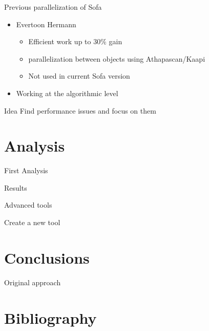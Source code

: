 \documentclass[xcolor={usenames,dvipsnames},draft]{beamer}
\newcommand{\sectiontitle}{}
\newcommand{\newsection}[1]{\renewcommand{\sectiontitle}{#1}\section{#1}}
\newcommand{\newHsection}[1]{\renewcommand{\sectiontitle}{#1}\section*{#1}}
\begin{document}
\begin{frame}{Previous parallelization of Sofa}
    \begin{itemize}
        \item Evertoon Hermann\cite{Hermann10Simulations} \\
            \begin{itemize}
                \item Efficient work up to $30\%$ gain 
                \item parallelization between objects using Athapascan/Kaapi
                \item Not used in current Sofa version 
            \end{itemize}
            \pause
        \item Working at the algorithmic level \cite{Toss12New}
    \end{itemize}
    \begin{alertblock}{Idea}
        Find performance issues and focus on them
    \end{alertblock}

\end{frame}

\newsection{Analysis}

\begin{frame}{First Analysis}
\end{frame}

\begin{frame}{Results}
\end{frame}

\begin{frame}{Advanced tools}
\end{frame}

\begin{frame}{Create a new tool}
\end{frame}

\newsection{Conclusions}

\setcounter{finalframe}{\value{framenumber}}


\begin{frame}{Original approach}
\end{frame}




\newHsection{Bibliography}
%



\end{document}
